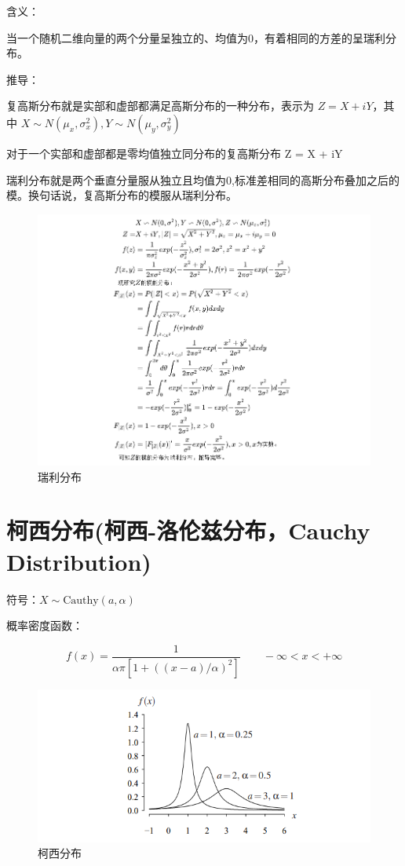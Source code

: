 \documentclass[12pt, a4paper, oneside]{ctexbook}
\begin{document}
 含义：

当一个随机二维向量的两个分量呈独立的、均值为0，有着相同的方差的呈瑞利分布。

 推导：

复高斯分布就是实部和虚部都满足高斯分布的一种分布，表示为 $ Z= X + iY$，其中 $X\sim N(\mu_x, \sigma_x^{2}), Y \sim N(\mu_y, \sigma_y^{2})$

对于一个实部和虚部都是零均值独立同分布的复高斯分布 Z = X + iY

瑞利分布就是两个垂直分量服从独立且均值为0,标准差相同的高斯分布叠加之后的模。换句话说，复高斯分布的模服从瑞利分布。

\begin{figure}[H]
  \centering
  \includegraphics[width=1\textwidth]{image/瑞利分布.png}
  \caption{瑞利分布}
  \label{fig:example}
\end{figure}

\section{柯西分布(柯西-洛伦兹分布，Cauchy Distribution)}

 符号：$X \sim \text{Cauthy}(a, \alpha)$

 概率密度函数：

$$
f(x) = \dfrac{1}{\alpha\pi[1 + ((x - a) / \alpha)^{2}]} \quad \quad -\infty < x < +\infty
$$

\begin{figure}[H]
  \centering
  \includegraphics[width=1\textwidth]{image/柯西分布.png}
  \caption{柯西分布}
  \label{fig:example}
\end{figure}
\end{document}
